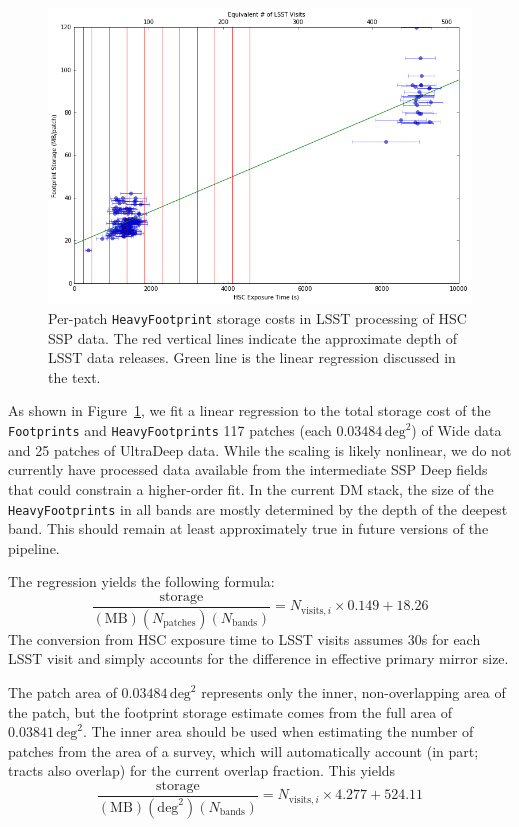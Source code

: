 \documentclass[DM,toc]{lsstdoc}
\begin{document}
\begin{figure}
\includegraphics[width=\textwidth]{regression.png}
\caption{Per-patch \texttt{HeavyFootprint} storage costs in LSST processing of HSC SSP data.  The red vertical lines indicate the approximate depth of LSST data releases.  Green line is the linear regression discussed in the text.}
\label{fig:regression}
\end{figure}


As shown in Figure~\ref{fig:regression}, we fit a linear regression to the total storage cost of the \texttt{Footprints} and \texttt{HeavyFootprints} 117 patches (each $0.03484\,\mathrm{deg}^2$) of Wide data and 25 patches of UltraDeep data.  While the scaling is likely nonlinear, we do not currently have processed data available from the intermediate SSP Deep fields that could constrain a higher-order fit.  In the current DM stack, the size of the \texttt{HeavyFootprints} in all bands are mostly determined by the depth of the deepest band.  This should remain at least approximately true in future versions of the pipeline.

The regression yields the following formula:
$$
    \frac{\mathrm{storage}}{(\mathrm{MB})(N_\mathrm{patches})(N_\mathrm{bands})} =
        N_{\mathrm{visits},i} \times 0.149 + 18.26
$$
The conversion from HSC exposure time to LSST visits assumes 30s for each LSST visit and simply accounts for the difference in effective primary mirror size.

The patch area of $0.03484\,\mathrm{deg}^2$ represents only the inner, non-overlapping area of the patch, but the footprint storage estimate comes from the full area of $0.03841\,\mathrm{deg}^2$.  The inner area should be used when estimating the number of patches from the area of a survey, which will automatically account (in part; tracts also overlap) for the current overlap fraction.  This yields
$$
    \frac{\mathrm{storage}}{(\mathrm{MB})(\mathrm{deg}^2)(N_\mathrm{bands})} =
        N_{\mathrm{visits},i} \times 4.277 + 524.11
$$
\end{document}
